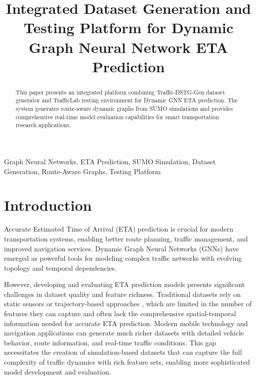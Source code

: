 \documentclass[conference]{IEEEtran}
\begin{document}
\title{Integrated Dataset Generation and Testing Platform for Dynamic Graph Neural Network ETA Prediction}

\author{
\and
{}
}

\maketitle

\begin{abstract}
This paper presents an integrated platform combining Traffic-DSTG-Gen dataset generator and TrafficLab testing environment for Dynamic GNN ETA prediction. The system generates route-aware dynamic graphs from SUMO simulations and provides comprehensive real-time model evaluation capabilities for smart transportation research applications.
\end{abstract}

\begin{IEEEkeywords}
Graph Neural Networks, ETA Prediction, SUMO Simulation, Dataset Generation, Route-Aware Graphs, Testing Platform
\end{IEEEkeywords}

\section{Introduction}

Accurate Estimated Time of Arrival (ETA) prediction is crucial for modern transportation systems, enabling better route planning, traffic management, and improved navigation services. Dynamic Graph Neural Networks (GNNs) have emerged as powerful tools for modeling complex traffic networks with evolving topology and temporal dependencies.

However, developing and evaluating ETA prediction models presents significant challenges in dataset quality and feature richness. Traditional datasets rely on static sensors \cite{b1} or trajectory-based approaches \cite{b2}, which are limited in the number of features they can capture and often lack the comprehensive spatial-temporal information needed for accurate ETA prediction. Modern mobile technology and navigation applications can generate much richer datasets with detailed vehicle behavior, route information, and real-time traffic conditions. This gap necessitates the creation of simulation-based datasets that can capture the full complexity of traffic dynamics with rich feature sets, enabling more sophisticated model development and evaluation.
\end{document}
